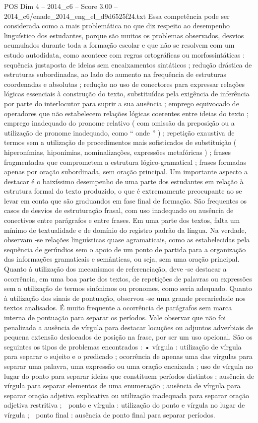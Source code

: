 \begin{textsample}{POS Dim 4 – 2014\_c6 – Score 3.00 – 2014\_c6/enade\_2014\_eng\_el\_d9d6525f24.txt}
Essa competência pode ser considerada como a mais problemática no que diz respeito ao desempenho linguístico dos estudantes, porque são muitos os problemas observados, desvios acumulados durante toda a formação escolar e que não se resolvem com um estudo autodidata, como acontece com regras ortográficas ou morfossintáticas : sequência justaposta de ideias sem encaixamentos sintáticos ; redução drástica de estruturas subordinadas, ao lado do aumento na frequência de estruturas coordenadas e absolutas ; redução no uso de conectores para expressar relações lógicas essenciais à construção do texto, substituídas pela exigência de inferência por parte do interlocutor para suprir a sua ausência ; emprego equivocado de operadores que não estabelecem relações lógicas coerentes entre ideias do texto ; emprego inadequado do pronome relativo ( com omissão da preposição ou a utilização de pronome inadequado, como “ onde ” ) ; repetição exaustiva de termos sem a utilização de procedimentos mais sofisticados de substituição ( hiperonímias, hiponímias, nominalizações, expressões metafóricas ) ; frases fragmentadas que comprometem a estrutura lógico-gramatical ; frases formadas apenas por oração subordinada, sem oração principal.
Um importante aspecto a destacar é o baixíssimo desempenho de uma parte dos estudantes em relação à estrutura formal do texto produzido, o que é extremamente preocupante ao se levar em conta que são graduandos em fase final de formação.
São frequentes os casos de desvios de estruturação frasal, com uso inadequado ou ausência de conectivos entre parágrafos e entre frases.
Em uma parte dos textos, falta um mínimo de textualidade e de domínio do registro padrão da língua.
Na verdade, observam -se relações linguísticas quase agramaticais, como as estabelecidas pela sequência de gerúndios sem o apoio de um ponto de partida para a organização das informações gramaticais e semânticas, ou seja, sem uma oração principal.
Quanto à utilização dos mecanismos de referenciação, deve -se destacar a ocorrência, em uma boa parte dos textos, de repetições de palavras ou expressões sem a utilização de termos sinônimos ou pronomes, como seria adequado.
Quanto à utilização dos sinais de pontuação, observou -se uma grande precariedade nos textos analisados.
É muito frequente a ocorrência de parágrafos sem marca interna de pontuação para separar os períodos.
Vale observar que não foi penalizada a ausência de vírgula para destacar locuções ou adjuntos adverbiais de pequena extensão deslocados de posição na frase, por ser um uso opcional.
São os seguintes os tipos de problemas encontrados : • vírgula : utilização de vírgula para separar o sujeito e o predicado ; ocorrência de apenas uma das vírgulas para separar uma palavra, uma expressão ou uma oração encaixada ; uso de vírgula no lugar do ponto para separar ideias que constituem períodos distintos ; ausência de vírgula para separar elementos de uma enumeração ; ausência de vírgula para separar oração adjetiva explicativa ou utilização inadequada para separar oração adjetiva restritiva ;  ponto e vírgula : utilização do ponto e vírgula no lugar de vírgula ;  ponto final : ausência de ponto final para separar períodos.

\end{textsample}
